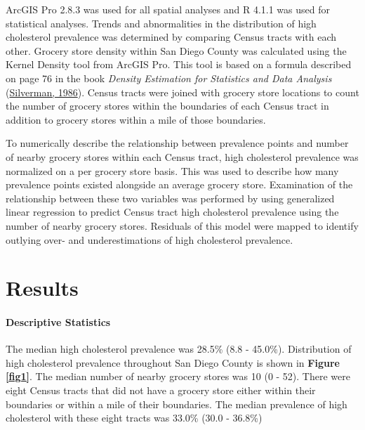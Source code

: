 \documentclass[]{elsarticle} %
\begin{document}
ArcGIS Pro 2.8.3 was used for all spatial analyses and R 4.1.1 was used
for statistical analyses. Trends and abnormalities in the distribution
of high cholesterol prevalence was determined by comparing Census tracts
with each other. Grocery store density within San Diego County was
calculated using the Kernel Density tool from ArcGIS Pro. This tool is
based on a formula described on page 76 in the book \emph{Density
Estimation for Statistics and Data Analysis}
(\protect\hyperlink{ref-silverman1986}{Silverman, 1986}). Census tracts
were joined with grocery store locations to count the number of grocery
stores within the boundaries of each Census tract in addition to grocery
stores within a mile of those boundaries.

To numerically describe the relationship between prevalence points and
number of nearby grocery stores within each Census tract, high
cholesterol prevalence was normalized on a per grocery store basis. This
was used to describe how many prevalence points existed alongside an
average grocery store. Examination of the relationship between these two
variables was performed by using generalized linear regression to
predict Census tract high cholesterol prevalence using the number of
nearby grocery stores. Residuals of this model were mapped to identify
outlying over- and underestimations of high cholesterol prevalence.

\hypertarget{results}{%
\section{Results}\label{results}}

\hypertarget{descriptive-statistics}{%
\paragraph{Descriptive Statistics}\label{descriptive-statistics}}

The median high cholesterol prevalence was 28.5\% (8.8 - 45.0\%).
Distribution of high cholesterol prevalence throughout San Diego County
is shown in \textbf{Figure \ref{fig1}}. The median number of nearby
grocery stores was 10 (0 - 52). There were eight Census tracts that did
not have a grocery store either within their boundaries or within a mile
of their boundaries. The median prevalence of high cholesterol with
these eight tracts was 33.0\% (30.0 - 36.8\%)
\end{document}
